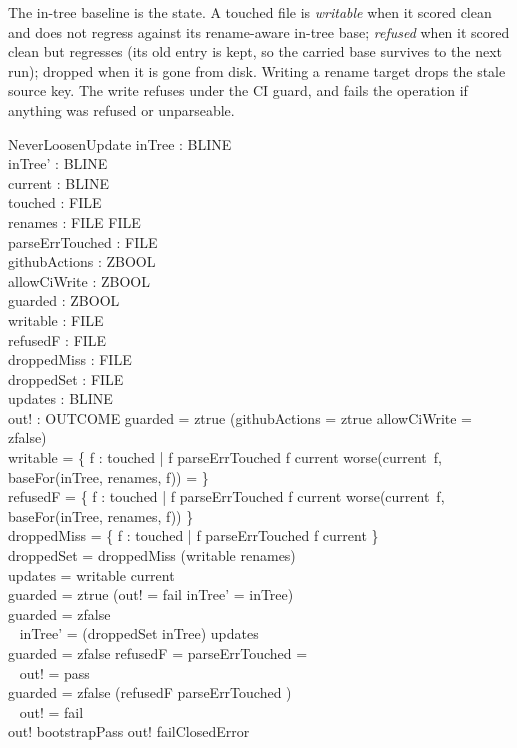 \documentclass[a4paper,10pt,fleqn]{article}
\begin{document}
The in-tree baseline is the state. A touched file is \emph{writable} when
it scored clean and does not regress against its rename-aware in-tree base;
\emph{refused} when it scored clean but regresses (its old entry is kept,
so the carried base survives to the next run); dropped when it is gone from
disk. Writing a rename target drops the stale source key. The write refuses
under the CI guard, and fails the operation if anything was refused or
unparseable.

\begin{schema}{NeverLoosenUpdate}
inTree : BLINE \\
inTree' : BLINE \\
current : BLINE \\
touched : \finset FILE \\
renames : FILE \pinj FILE \\
parseErrTouched : \finset FILE \\
githubActions : ZBOOL \\
allowCiWrite : ZBOOL \\
guarded : ZBOOL \\
writable : \finset FILE \\
refusedF : \finset FILE \\
droppedMiss : \finset FILE \\
droppedSet : \finset FILE \\
updates : BLINE \\
out! : OUTCOME
\where
guarded = ztrue \iff (githubActions = ztrue \land allowCiWrite = zfalse) \\
writable = \{ f : touched | f \notin parseErrTouched \land f \in \dom current \land worse(current~f, baseFor(inTree, renames, f)) = \emptyset \} \\
refusedF = \{ f : touched | f \notin parseErrTouched \land f \in \dom current \land worse(current~f, baseFor(inTree, renames, f)) \neq \emptyset \} \\
droppedMiss = \{ f : touched | f \notin parseErrTouched \land f \notin \dom current \} \\
droppedSet = droppedMiss \cup \ran (writable \dres renames) \\
updates = writable \dres current \\
guarded = ztrue \implies (out! = fail \land inTree' = inTree) \\
guarded = zfalse \implies \\
\quad~ inTree' = (droppedSet \ndres inTree) \oplus updates \\
guarded = zfalse \land refusedF = \emptyset \land parseErrTouched = \emptyset \\
\quad~ \implies out! = pass \\
guarded = zfalse \land (refusedF \neq \emptyset \lor parseErrTouched \neq \emptyset) \\
\quad~ \implies out! = fail \\
out! \neq bootstrapPass \land out! \neq failClosedError
\end{schema}
\end{document}
